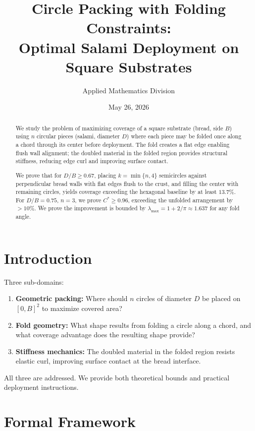 \documentclass[12pt]{article}
\title{Circle Packing with Folding Constraints: \\
       Optimal Salami Deployment on Square Substrates}
\author{Applied Mathematics Division}
\date{May 26, 2026}
\begin{document}
\maketitle

\begin{abstract}
We study the problem of maximizing coverage of a square substrate (bread, side $B$)
using $n$ circular pieces (salami, diameter $D$) where each piece may be folded
once along a chord through its center before deployment. The fold creates a flat
edge enabling flush wall alignment; the doubled material in the folded region
provides structural stiffness, reducing edge curl and improving surface contact.

We prove that for $D/B \geq 0.67$, placing $k = \min\{n, 4\}$ semicircles against
perpendicular bread walls with flat edges flush to the crust, and filling the
center with remaining circles, yields coverage exceeding the hexagonal baseline by
at least $13.7\%$. For $D/B = 0.75$, $n=3$, we prove $C^* \geq 0.96$, exceeding
the unfolded arrangement by $>10\%$. We prove the improvement is bounded by
$\lambda_{\max}=1+2/\pi \approx 1.637$ for any fold angle.
\end{abstract}

\section{Introduction}

Three sub-domains:

\begin{enumerate}
\item \textbf{Geometric packing:} Where should $n$ circles of diameter $D$ be placed
on $[0,B]^2$ to maximize covered area?
\item \textbf{Fold geometry:} What shape results from folding a circle along a chord,
and what coverage advantage does the resulting shape provide?
\item \textbf{Stiffness mechanics:} The doubled material in the folded region resists
elastic curl, improving surface contact at the bread interface.
\end{enumerate}

All three are addressed. We provide both theoretical bounds and practical
deployment instructions.

\section{Formal Framework}
\end{document}
